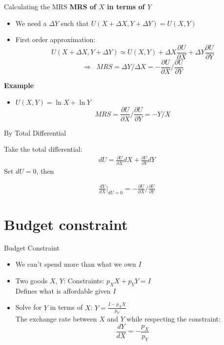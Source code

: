 \documentclass[handout]{beamer}
\begin{document}
\begin{frame}{Calculating the MRS}
\textbf{MRS of $X$ in terms of $Y$} \pause
\begin{itemize}
\item We need a $\Delta Y$ such that $U(X + \Delta X, Y + \Delta Y) = U(X,Y)$
\item First order approximation: $$U(X+\Delta X, Y+ \Delta Y) \simeq  U(X,Y)+  \Delta X  \frac{\partial U}{\partial X} + \Delta Y \frac{\partial U}{\partial Y}$$\pause
$$ \Rightarrow \;\; MRS = \Delta Y/ \Delta X =  -\frac{\partial U}{\partial X}/ \frac{\partial U}{\partial Y}$$
\end{itemize}

\textbf{Example}
\begin{itemize}
\item $U(X,Y) = \ln X + \ln Y$
 $$MRS = \frac{\partial U}{\partial X}/ \frac{\partial U}{\partial Y} = -Y/X$$
\end{itemize}

\end{frame}

\begin{frame}{By Total Differential}

Take the total differential:
\begin{align}
dU = \frac{\partial U}{\partial X}dX + \frac{\partial U}{\partial Y}dY
\end{align}
Set $dU = 0$, then 

\begin{align}
\frac{dY}{dX}\bigg\rvert_{dU=0} = -\frac{\partial U}{\partial X}/ \frac{\partial U}{\partial Y}
\end{align}

\end{frame}


\section{Budget constraint}

\begin{frame}{Budget Constraint}
\begin{itemize}
\item We can't spend more than what we own $I$
\item Two goods $X$, $Y$:  Constraints: $p_X X + p_Y Y = I$ \\ Defines what is affordable given $I$\\
\item Solve for $Y$ in terms of  $X$:     $Y = \frac{I - p_X X}{p_Y}$\\
The exchange rate between $X$ and $Y$ while respecting the constraint: $$\frac{dY}{dX} = -\frac{p_X}{p_Y}$$
\end{itemize}

\end{frame}
\end{document}
